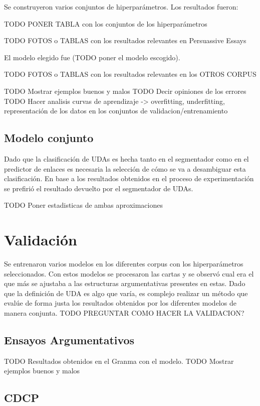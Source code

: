 Se construyeron varios conjuntos de hiperparámetros. Los resultados fueron:

TODO PONER TABLA con los conjuntos de los hiperparámetros

TODO FOTOS o TABLAS con los resultados relevantes en Persuassive Essays 

El modelo elegido fue (TODO poner el modelo escogido).

TODO FOTOS o TABLAS con los resultados relevantes en los OTROS CORPUS

TODO Mostrar ejemplos buenos y malos
TODO Decir opiniones de los errores
TODO Hacer analisis curvas de aprendizaje -> overfitting, underfitting, representación de los datos en los conjuntos de validacion/entrenamiento

\subsection{Modelo conjunto}

Dado que la clasificación de UDAs es hecha tanto en el segmentador como en el predictor de enlaces es necesaria 
la selección de cómo se va a desambiguar esta clasificación. En base a los resultados obtenidos en el proceso
de experimentación se prefirió el resultado devuelto por el segmentador de UDAs.

TODO Poner estadisticas de ambas aproximaciones

\section{Validación}

Se entrenaron varios modelos en los diferentes corpus con los hiperparámetros seleccionados. Con estos modelos 
se procesaron las cartas y se observó cual era el que más se ajustaba a las estructuras argumentativas presentes 
en estas. Dado que la definición de UDA es algo que varía, es complejo realizar un método que evalúe de forma 
justa los resultados obtenidos por los diferentes modelos de manera conjunta. TODO PREGUNTAR COMO HACER LA VALIDACION?

\subsection{Ensayos Argumentativos}

TODO Resultados obtenidos en el Granma con el modelo.
TODO Mostrar ejemplos buenos y malos

\subsection{CDCP}

